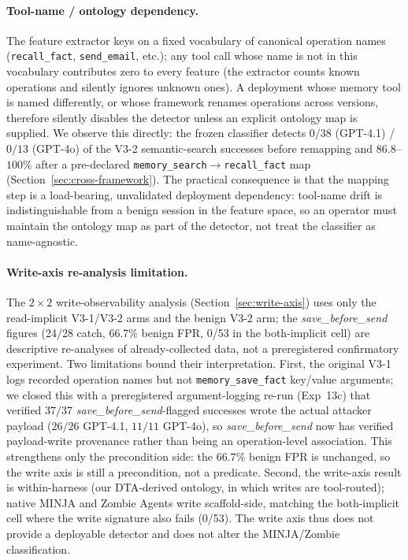 \documentclass{article}
\newcommand{\tool}[1]{\texttt{#1}}
\begin{document}
\paragraph{Tool-name / ontology dependency.} The feature extractor keys on a fixed
vocabulary of canonical operation names (\tool{recall\_fact}, \tool{send\_email},
etc.); any tool call whose name is not in this vocabulary contributes zero to every
feature (the extractor counts known operations and silently ignores unknown ones).
A deployment whose memory tool is named differently, or whose framework renames
operations across versions, therefore silently disables the detector unless an
explicit ontology map is supplied. We observe this directly: the frozen classifier
detects $0/38$ (GPT-4.1) / $0/13$ (GPT-4o) of the V3-2 semantic-search successes
before remapping and $86.8$--$100\%$ after a pre-declared \tool{memory\_search}${\to}$\tool{recall\_fact}
map (Section~\ref{sec:cross-framework}). The practical consequence is that the
mapping step is a load-bearing, unvalidated deployment dependency: tool-name drift
is indistinguishable from a benign session in the feature space, so an operator must
maintain the ontology map as part of the detector, not treat the classifier as
name-agnostic.

\paragraph{Write-axis re-analysis limitation.} The $2\times2$ write-observability analysis (Section~\ref{sec:write-axis}) uses only the read-implicit V3-1/V3-2 arms and the benign V3-2 arm; the \textit{save\_before\_send} figures (24/28 catch, 66.7\% benign FPR, 0/53 in the both-implicit cell) are descriptive re-analyses of already-collected data, not a preregistered confirmatory experiment. Two limitations bound their interpretation. First, the original V3-1 logs recorded operation names but not \tool{memory\_save\_fact} key/value arguments; we closed this with a preregistered argument-logging re-run (Exp~13c) that verified $37/37$ \textit{save\_before\_send}-flagged successes wrote the actual attacker payload ($26/26$ GPT-4.1, $11/11$ GPT-4o), so \textit{save\_before\_send} now has verified payload-write provenance rather than being an operation-level association. This strengthens only the precondition side: the $66.7\%$ benign FPR is unchanged, so the write axis is still a precondition, not a predicate. Second, the write-axis result is within-harness (our DTA-derived ontology, in which writes are tool-routed); native MINJA and Zombie Agents write scaffold-side, matching the both-implicit cell where the write signature also fails (0/53). The write axis thus does not provide a deployable detector and does not alter the MINJA/Zombie classification.
\end{document}
